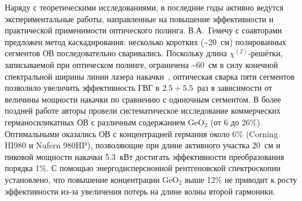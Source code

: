 Наряду с теоретическими исследованиями, в последние годы активно ведутся экспериментальные работы, направленные на повышение эффективности и практической применимости оптического полинга. В.А.~Гемечу с соавторами~\cite{gemechu2023efficient, gemechu2023survey} предложен метод каскадирования: несколько коротких (\sim20~см) полированных сегментов ОВ последовательно сваривались. Поскольку длина $\chi^{(2)}$-решётки, записываемой при оптическом полинге, ограничена \sim60~см в силу конечной спектральной ширины линии лазера накачки~\cite{stolen1987self, batdorf1989study}, оптическая сварка пяти сегментов позволило увеличить эффективность ГВГ в $2.5\div5.5$~раз в зависимости от величины мощности накачки по сравнению с одиночным сегментом. В более поздней работе авторы провели систематическое исследование коммерческих германосиликатных ОВ с различным содержанием GeO$_2$ (от 6 до 26\%). Оптимальными оказались ОВ с концентрацией германия около 6\% (Corning HI980 и Nufern 980HP), позволяющие при длине активного участка 20~см и пиковой мощности накачки 5.3~кВт достигать эффективности преобразования порядка 1\%. С помощью энергодисперсионной рентгеновской спектроскопии установлено, что повышение концентрации GeO$_2$ выше 12\% не приводит к росту эффективности из-за увеличения потерь на длине волны второй гармоники.



